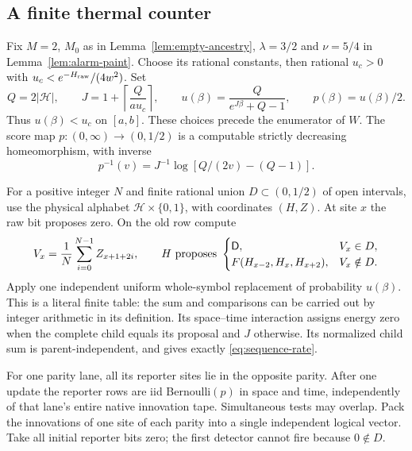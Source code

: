 \subsection{A finite thermal counter}

Fix \(M=2\), \(M_0\) as in Lemma~\ref{lem:empty-ancestry}, \(\lambda=3/2\) and \(\nu=5/4\) in Lemma~\ref{lem:alarm-paint}. Choose its rational constants, then rational \(u_c>0\) with \(u_c<e^{-H_{\rm raw}}/(4w^2)\). Set
\begin{equation}\label{eq:sequence-rate}
Q=2|\mathcal H|,\qquad J=1+\left\lceil\frac{Q}{au_c}\right\rceil,
\qquad u(\beta)=\frac{Q}{e^{J\beta}+Q-1},\qquad p(\beta)=u(\beta)/2.
\end{equation}
Thus \(u(\beta)<u_c\) on \([a,b]\). These choices precede the enumerator of \(W\). The score map \(p:(0,\infty)\to(0,1/2)\) is a computable strictly decreasing homeomorphism, with inverse
\[
p^{-1}(v)=J^{-1}\log[Q/(2v)-(Q-1)].
\]

For a positive integer \(N\) and finite rational union \(D\subset(0,1/2)\) of open intervals, use the physical alphabet \(\mathcal H\times\{0,1\}\), with coordinates \((H,Z)\). At site \(x\) the raw bit proposes zero. On the old row compute
\[
V_x=\frac1N\sum_{i=0}^{N-1}Z_{x+1+2i},\qquad
H\text{ proposes }
\begin{cases}
\mathsf D,&V_x\in D,\\
F(H_{x-2},H_x,H_{x+2}),&V_x\notin D.
\end{cases}
\]
Apply one independent uniform whole-symbol replacement of probability \(u(\beta)\). This is a literal finite table: the sum and comparisons can be carried out by integer arithmetic in its definition. Its space--time interaction assigns energy zero when the complete child equals its proposal and \(J\) otherwise. Its normalized child sum is parent-independent, and gives exactly \eqref{eq:sequence-rate}.

For one parity lane, all its reporter sites lie in the opposite parity. After one update the reporter rows are iid Bernoulli\((p)\) in space and time, independently of that lane's entire native innovation tape. Simultaneous tests may overlap. Pack the innovations of one site of each parity into a single independent logical vector. Take all initial reporter bits zero; the first detector cannot fire because \(0\notin D\).

